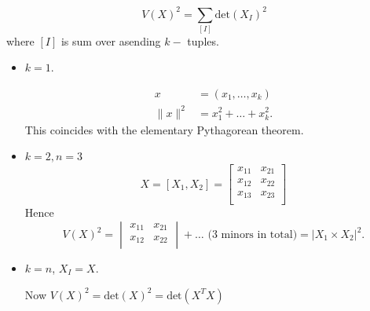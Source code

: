 \begin{theorem}
	\[
		V(X)^2 = \sum_{[I]} \text{det}(X_I)^2
	\]
	where $[I]$ is sum over asending $k-$ tuples.
\end{theorem}
\begin{example}

\begin{itemize}
\item $k=1$.
	
	\begin{align*}
		x &= (x_1, \ldots, x_k)\\
		\|x\|^2 &=  x_1^2 + \ldots + x_k^2 
	.\end{align*}
	This coincides with the elementary Pythagorean theorem.
\item $k = 2, n = 3$
\[
	X = [X_1, X_2] = 
 	\begin{bmatrix}
		x_{11} & x_{21} \\
		x_{12} & x_{22} \\
		x_{13} & x_{23} \\
	\end{bmatrix}
\]
Hence
\[
	V(X)^2 = 
\begin{vmatrix}
	x_{11} & x_{21} \\
	x_{12} & x_{22} \\
\end{vmatrix}
+ \ldots \text{ (3 minors in total)}
= |X_1 \times X_2|^2
.\] 

\item $k = n$, $X_I = X$.

	Now $V(X)^2 = \text{det}(X)^2 = \text{det}(X^T X)$
\end{itemize}
\end{example}

